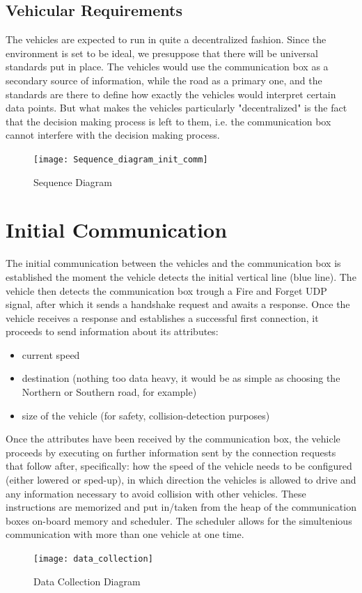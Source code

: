 \documentclass[conference]{IEEEtran}
\begin{document}
\subsection{Vehicular Requirements}
The vehicles are expected to run in quite a decentralized fashion. Since the environment is set to be ideal, we presuppose that there will be universal standards put in place. The vehicles would use the communication box as a secondary source of information, while the road as a primary one, and the standards are there to define how exactly the vehicles would interpret certain data points. But what makes the vehicles particularly "decentralized" is the fact that the decision making process is left to them, i.e. the communication box cannot interfere with the decision making process.
\begin{figure}[h!]
	\texttt{[image: Sequence\_diagram\_init\_comm]}
	\caption{Sequence Diagram}
	\centering
\end{figure}


\section{Initial Communication}
The initial communication between the vehicles and the communication box is established the moment the vehicle detects the initial vertical line (blue line). The vehicle then detects the communication box trough a Fire and Forget UDP signal, after which it sends a handshake request and awaits a response. Once the vehicle receives a response and establishes a successful first connection, it proceeds to send information about its attributes:

\begin{itemize}
	\item current speed
	\item destination (nothing too data heavy, it would be as simple as choosing the Northern or Southern road, for example)
	\item size of the vehicle (for safety, collision-detection purposes)
\end{itemize} 
Once the attributes have been received by the communication box, the vehicle proceeds by executing on further information sent by the connection requests that follow after, specifically: how the speed of the vehicle needs to be configured (either lowered or sped-up), in which direction the vehicles is allowed to drive and any information necessary to avoid collision with other vehicles. These instructions are memorized and put in/taken from the heap of the communication boxes on-board memory and scheduler. The scheduler allows for the simultenious communication with more than one vehicle at one time.
\begin{figure}[h!]
	\centerline{\texttt{[image: data\_collection]}}
	\caption{Data Collection Diagram}
\end{figure}
\end{document}
